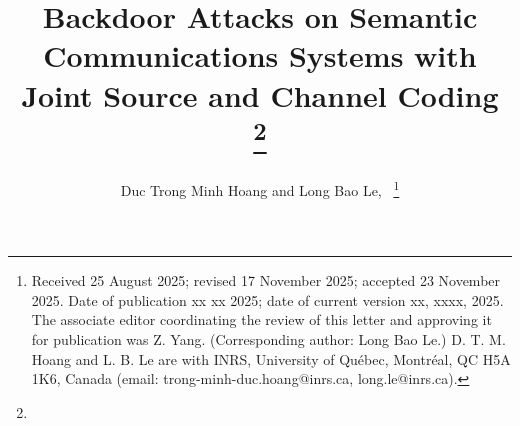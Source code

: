 \documentclass[journal]{IEEEtran}
\begin{document}
\title{Backdoor Attacks on Semantic Communications Systems with  Joint Source and Channel Coding \\
\thanks{}
}

\author{Duc Trong Minh Hoang and Long Bao Le,~
\thanks{Received 25 August 2025; revised 17 November 2025; accepted 23 November 2025. Date
 of publication xx xx 2025; date of current version xx, xxxx, 2025. The associate editor coordinating the review of this letter and approving it
 for publication was Z. Yang. (Corresponding author: Long Bao Le.)
 D. T. M. Hoang and L. B. Le are with INRS, University of Qu\'{e}bec, Montr\'{e}al, QC H5A 1K6, Canada (email:  
trong-minh-duc.hoang@inrs.ca, long.le@inrs.ca).}%
}
\maketitle
\end{document}
